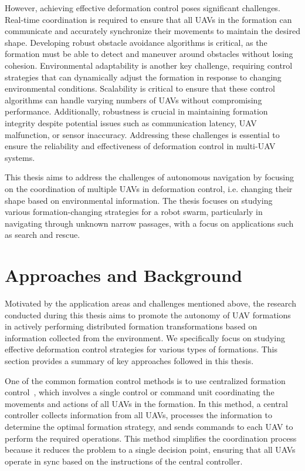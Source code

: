 However, achieving effective deformation control poses significant challenges. Real-time coordination is required to ensure that all UAVs in the formation can communicate and accurately synchronize their movements to maintain the desired shape. Developing robust obstacle avoidance algorithms is critical, as the formation must be able to detect and maneuver around obstacles without losing cohesion. Environmental adaptability is another key challenge, requiring control strategies that can dynamically adjust the formation in response to changing environmental conditions. Scalability is critical to ensure that these control algorithms can handle varying numbers of UAVs without compromising performance. Additionally, robustness is crucial in maintaining formation integrity despite potential issues such as communication latency, UAV malfunction, or sensor inaccuracy. Addressing these challenges is essential to ensure the reliability and effectiveness of deformation control in multi-UAV systems.

This thesis aims to address the challenges of autonomous navigation by focusing on the coordination of multiple UAVs in deformation control, i.e. changing their shape based on environmental information. The thesis focuses on studying various formation-changing strategies for a robot swarm, particularly in navigating through unknown narrow passages, with a focus on applications such as search and rescue.

\section{Approaches and Background}
Motivated by the application areas and challenges mentioned above, the research conducted during this thesis aims to promote the autonomy of UAV formations in actively performing distributed formation transformations based on information collected from the environment. We specifically focus on studying effective deformation control strategies for various types of formations. This section provides a summary of key approaches followed in this thesis.

One of the common formation control methods is to use centralized formation control~\cite{Oh2015,1545539}, which involves a single control or command unit coordinating the movements and actions of all UAVs in the formation. In this method, a central controller collects information from all UAVs, processes the information to determine the optimal formation strategy, and sends commands to each UAV to perform the required operations. This method simplifies the coordination process because it reduces the problem to a single decision point, ensuring that all UAVs operate in sync based on the instructions of the central controller.

